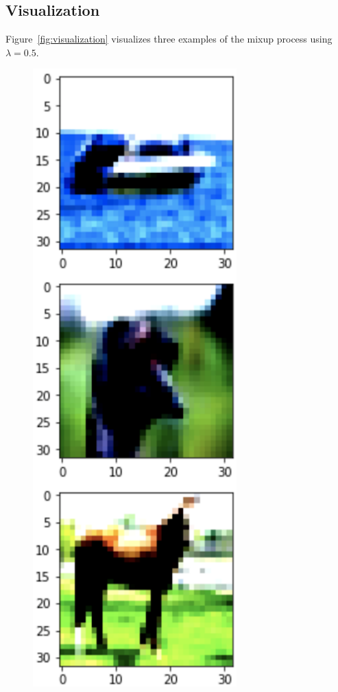 \newpage
\subsection{Visualization}

Figure~\ref{fig:visualization} visualizes three examples of the mixup process using $\lambda = 0.5$.

\begin{figure}[ht]
    \centering
    \begin{minipage}{.25\columnwidth}
        \centering
        \includegraphics[width=0.7\textwidth]{figures/1.png} \\

\end{minipage}
\end{figure}
